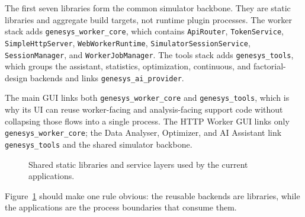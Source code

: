 The first seven libraries form the common simulator backbone. They are static
libraries and aggregate build targets, not runtime plugin processes. The worker
stack adds \texttt{genesys\_worker\_core}, which contains
\texttt{ApiRouter}, \texttt{TokenService}, \texttt{SimpleHttpServer},
\texttt{WebWorkerRuntime}, \texttt{SimulatorSessionService},
\texttt{SessionManager}, and \texttt{WorkerJobManager}. The tools stack adds
\texttt{genesys\_tools}, which groups the assistant, statistics, optimization,
continuous, and factorial-design backends and links \texttt{genesys\_ai\_provider}.

The main GUI links both \texttt{genesys\_worker\_core} and
\texttt{genesys\_tools}, which is why its UI can reuse worker-facing and
analysis-facing support code without collapsing those flows into a single
process. The HTTP Worker GUI links only \texttt{genesys\_worker\_core}; the
Data Analyser, Optimizer, and AI Assistant link \texttt{genesys\_tools} and the
shared simulator backbone.

\begin{figure}[htbp]
\centering
\caption{Shared static libraries and service layers used by the current applications.}
\label{fig:application-architecture-shared-libraries}
\end{figure}

Figure~\ref{fig:application-architecture-shared-libraries} should make one
rule obvious: the reusable backends are libraries, while the applications are
the process boundaries that consume them.

